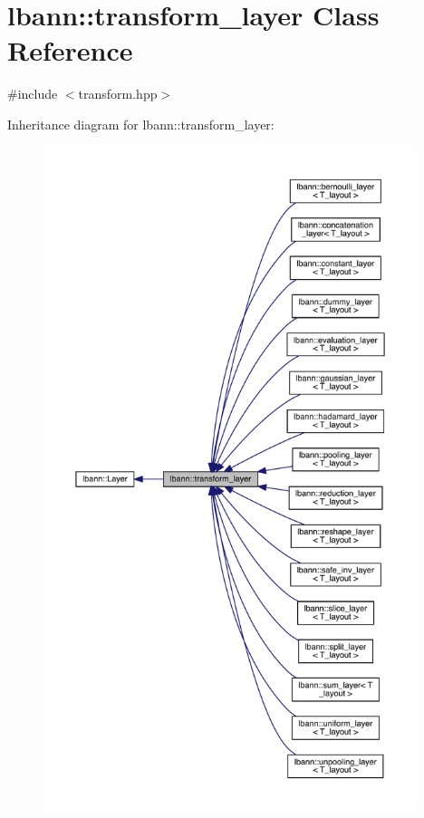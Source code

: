 \hypertarget{classlbann_1_1transform__layer}{}\section{lbann\+:\+:transform\+\_\+layer Class Reference}
\label{classlbann_1_1transform__layer}


{\ttfamily \#include $<$transform.\+hpp$>$}



Inheritance diagram for lbann\+:\+:transform\+\_\+layer\+:\nopagebreak
\begin{figure}[H]
\begin{center}
\leavevmode
\includegraphics[height=550pt]{classlbann_1_1transform__layer__inherit__graph}
\end{center}
\end{figure}


